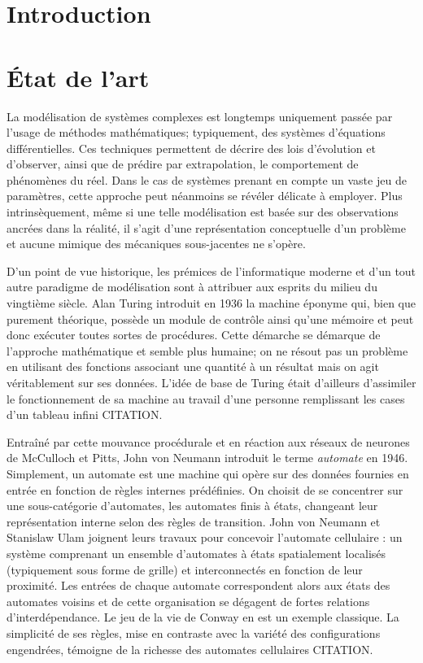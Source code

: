 \documentclass[10pt]{article}
\begin{document}
\begin{multicols}{2}

\section{Introduction}

\section{\'Etat de l'art}

La modélisation de systèmes complexes est longtemps uniquement passée
par l'usage de méthodes mathématiques; typiquement, des systèmes
d'équations différentielles. Ces techniques permettent de décrire des
lois d'évolution et d'observer, ainsi que de prédire par
extrapolation, le comportement de phénomènes du réel. Dans le cas de
systèmes prenant en compte un vaste jeu de paramètres, cette approche
peut néanmoins se révéler délicate à employer. Plus intrinsèquement,
même si une telle modélisation est basée sur des observations ancrées
dans la réalité, il s'agit d'une représentation conceptuelle d'un
problème et aucune mimique des mécaniques sous-jacentes ne s'opère.

D'un point de vue historique, les prémices de l'informatique moderne
et d'un tout autre paradigme de modélisation sont à attribuer aux
esprits du milieu du vingtième siècle. Alan Turing introduit en 1936
la machine éponyme qui, bien que purement théorique, possède un module
de contrôle ainsi qu'une mémoire et peut donc exécuter toutes sortes
de procédures. Cette démarche se démarque de l'approche mathématique
et semble plus humaine; on ne résout pas un problème en utilisant des
fonctions associant une quantité à un résultat mais on agit
véritablement sur ses données. L'idée de base de Turing était
d'ailleurs d'assimiler le fonctionnement de sa machine au travail
d'une personne remplissant les cases d'un tableau infini CITATION.

Entraîné par cette mouvance procédurale et en réaction aux réseaux de
neurones de McCulloch et Pitts, John von Neumann introduit le terme
\textit{automate} en 1946. Simplement, un automate est une machine qui
opère sur des données fournies en entrée en fonction de règles
internes prédéfinies. On choisit de se concentrer sur une
sous-catégorie d'automates, les automates finis à états, changeant
leur représentation interne selon des règles de transition. John von
Neumann et Stanislaw Ulam joignent leurs travaux pour concevoir
l'automate cellulaire : un système comprenant un ensemble d'automates
à états spatialement localisés (typiquement sous forme de grille) et
interconnectés en fonction de leur proximité. Les entrées de chaque
automate correspondent alors aux états des automates voisins et de
cette organisation se dégagent de fortes relations
d'interdépendance. Le jeu de la vie de Conway en est un exemple
classique. La simplicité de ses règles, mise en contraste avec la
variété des configurations engendrées, témoigne de la richesse des
automates cellulaires CITATION.


\end{multicols}
\end{document}
